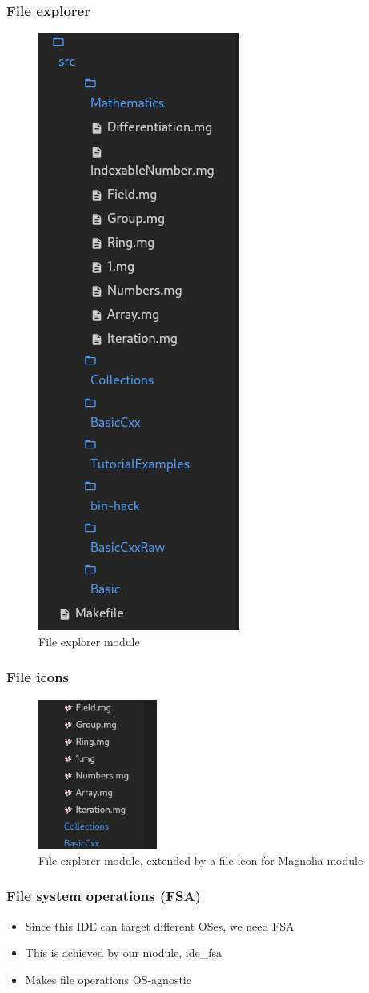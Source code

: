 \begin{frame}
  \frametitle{File explorer}
  \begin{figure}
    \centering
    \includegraphics[height=0.5\textwidth]{./pics/ide-explorer.png}
    \caption{
      File explorer module
    }
  \end{figure}
\end{frame}

\begin{frame}
  \frametitle{File icons}
  \begin{figure}
    \centering
    \includegraphics[width=0.35\textwidth]{./pics/file-explorer-icons.png}
    \caption{
      File explorer module, extended by a file-icon for Magnolia module
    }
  \end{figure}
\end{frame}

\begin{frame}
  \frametitle{File system operations (FSA)}
  \begin{itemize}
    \item Since this IDE can target different OSes, we need FSA
    \item This is achieved by our module, ide\_fsa
    \item Makes file operations OS-agnostic
  \end{itemize}
\end{frame}

